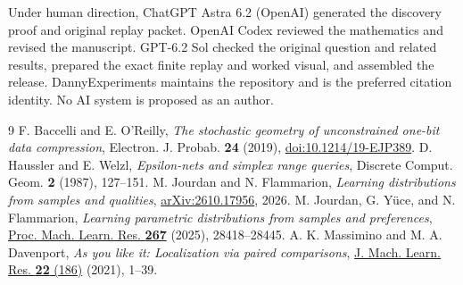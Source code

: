 \documentclass[11pt,a4paper]{amsart}
\begin{document}
\begingroup\raggedright
Under human direction, ChatGPT Astra 6.2 (OpenAI) generated the discovery proof and original replay packet. OpenAI Codex reviewed the mathematics and revised the manuscript. GPT-6.2 Sol checked the original question and related results, prepared the exact finite replay and worked visual, and assembled the release. DannyExperiments maintains the repository and is the preferred citation identity. No AI system is proposed as an author.
\par\endgroup

\begin{thebibliography}{9}
F. Baccelli and E. O'Reilly, \emph{The stochastic geometry of unconstrained one-bit data compression}, Electron. J. Probab. \textbf{24} (2019), \href{https://doi.org/10.1214/19-EJP389}{doi:10.1214/19-EJP389}.
D. Haussler and E. Welzl, \emph{Epsilon-nets and simplex range queries}, Discrete Comput. Geom. \textbf{2} (1987), 127--151.
M. Jourdan and N. Flammarion, \emph{Learning distributions from samples and qualities}, \href{https://arxiv.org/abs/2610.17956}{arXiv:2610.17956}, 2026.
M. Jourdan, G. Y\"uce, and N. Flammarion, \emph{Learning parametric distributions from samples and preferences}, \href{https://proceedings.mlr.press/v267/jourdan25a.html}{Proc. Mach. Learn. Res. \textbf{267}} (2025), 28418--28445.
A. K. Massimino and M. A. Davenport, \emph{As you like it: Localization via paired comparisons}, \href{https://jmlr.org/papers/v22/18-105.html}{J. Mach. Learn. Res. \textbf{22} (186)} (2021), 1--39.
\end{thebibliography}
\end{document}
